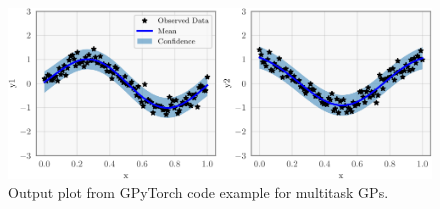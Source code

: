 \begin{figure}[h!]
  \centering
  \includegraphics[width=\linewidth]{figures/example_gpytorch_plot_multitask.pdf}
  \caption{
    Output plot from GPyTorch code example for multitask GPs.
  }
  \label{fig:example_gpytorch_plot_multitask}
\end{figure}
